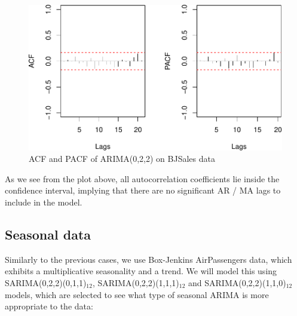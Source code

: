 \documentclass[
]{book}
\theoremstyle{definition}
\theoremstyle{definition}
\theoremstyle{definition}
\theoremstyle{definition}
\theoremstyle{remark}
\begin{document}
\begin{figure}
\centering
\includegraphics{adam_files/figure-latex/adamARIMAPlotBJSalesACFPACF-1.pdf}
\caption{\label{fig:adamARIMAPlotBJSalesACFPACF}ACF and PACF of ARIMA(0,2,2) on BJSales data}
\end{figure}

As we see from the plot above, all autocorrelation coefficients lie inside the confidence interval, implying that there are no significant AR / MA lags to include in the model.

\hypertarget{ARIMAExampleInRSeasonal}{%
\subsection{Seasonal data}\label{ARIMAExampleInRSeasonal}}

Similarly to the previous cases, we use Box-Jenkins AirPassengers data, which exhibits a multiplicative seasonality and a trend. We will model this using SARIMA(0,2,2)(0,1,1)\(_{12}\), SARIMA(0,2,2)(1,1,1)\(_{12}\) and SARIMA(0,2,2)(1,1,0)\(_{12}\) models, which are selected to see what type of seasonal ARIMA is more appropriate to the data:
\end{document}
